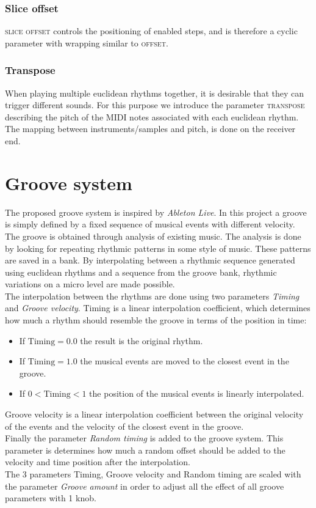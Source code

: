 \subsubsection{Slice offset}
\textsc{slice offset} controls the positioning of enabled steps, and is therefore a cyclic parameter with wrapping similar to \textsc{offset}. 

\subsubsection{Transpose}
When playing multiple euclidean rhythms together, it is desirable that they can trigger different sounds. For this purpose we introduce the parameter \textsc{transpose} describing the pitch of the MIDI notes associated with each euclidean rhythm. The mapping between instruments/samples and pitch, is done on the receiver end.

\section{Groove system}
\label{sec:groovesystem}
The proposed groove system is inspired by \textit{Ableton Live}. In this project a groove is simply defined by a fixed sequence of musical events with different velocity. The groove is obtained through analysis of existing music. The analysis is done by looking for repeating rhythmic patterns in some style of music. These patterns are saved in a bank. By interpolating between a rhythmic sequence generated using euclidean rhythms and a sequence from the groove bank, rhythmic variations on a micro level are made possible.\\
The interpolation between the rhythms are done using two parameters \textit{Timing} and \textit{Groove velocity}. Timing is a linear interpolation coefficient, which determines how much a rhythm should resemble the groove in terms of the position in time:
\begin{itemize}
\item If $\text{Timing} = 0.0$ the result is the original rhythm.
\item If $\text{Timing} = 1.0$ the musical events are moved to the closest event in the groove.
\item If $0 < \text{Timing} < 1$ the position of the musical events is linearly interpolated.
\end{itemize}
Groove velocity is a linear interpolation coefficient between the original velocity of the events and the velocity of the closest event in the groove.\\
Finally the parameter \textit{Random timing} is added to the groove system. This parameter is determines how much a random offset should be added to the velocity and time position after the interpolation.\\
The 3 parameters Timing, Groove velocity and Random timing are scaled with the parameter \textit{Groove amount} in order to adjust all the effect of all groove parameters with 1 knob.

